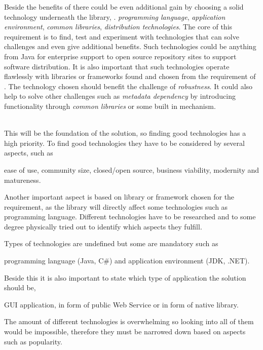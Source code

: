 Beside the benefits of  there could be even additional gain by choosing
a solid technology underneath the library, \eg. \emph{programming language},
\emph{application environment}, \emph{common libraries}, \emph{distribution technologies}.
The core of this requirement is to find, test and experiment with technologies that can solve
challenges and even give additional benefits.
Such technologies could be anything from Java for enterprise support to open source repository
sites to support software distribution.
It is also important that such technologies operate flawlessly with libraries or frameworks
found and chosen from the requirement of .
The technology chosen should benefit the challenge of \emph{robustness}.
It could also help to solve other challenges such as \emph{metadata dependency} by introducing
functionality through \emph{common libraries} or some built in mechanism.

 \\
This will be the foundation of the solution, so finding good technologies has a high priority.
To find good technologies they have to be considered by several aspects, such as
\begin{ii}
  \iitem ease of use,
  \iitem community size,
  \iitem closed/open source,
  \iitem business viability,
  \iitem modernity and 
  \iitem matureness.
\end{ii}
Another important aspect is based on library or framework chosen for the  requirement,
as the library will directly affect some technologies such as programming language.
Different technologies have to be researched and to some degree physically tried out to identify
which aspects they fulfill.

Types of technologies are undefined but some are mandatory such as 
\begin{ii}
  \iitem programming language (Java, C\#) and 
  \iitem application environment (JDK, .NET).
\end{ii}
Beside this it is also important to state which type of application the solution should be, 
\begin{ii}
  \iitem GUI application,
  \iitem {} in form of public Web Service or
  \iitem {} in form of native library.
\end{ii}
The amount of different technologies is overwhelming so looking into all of them would be impossible,
therefore they must be narrowed down based on aspects such as popularity.

